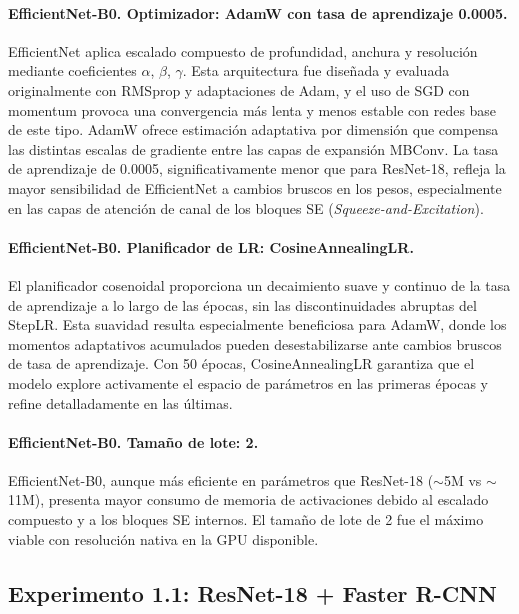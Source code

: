 \paragraph{EfficientNet-B0. Optimizador: AdamW con tasa de aprendizaje 0.0005.}
EfficientNet aplica escalado compuesto de profundidad, anchura y resolución mediante coeficientes $\alpha$, $\beta$, $\gamma$. Esta arquitectura fue diseñada y evaluada originalmente con RMSprop y adaptaciones de Adam, y el uso de SGD con momentum provoca una convergencia más lenta y menos estable con redes base de este tipo. AdamW ofrece estimación adaptativa por dimensión que compensa las distintas escalas de gradiente entre las capas de expansión MBConv. La tasa de aprendizaje de 0.0005, significativamente menor que para ResNet-18, refleja la mayor sensibilidad de EfficientNet a cambios bruscos en los pesos, especialmente en las capas de atención de canal de los bloques SE (\textit{Squeeze-and-Excitation}).

\paragraph{EfficientNet-B0. Planificador de LR: CosineAnnealingLR.}
El planificador cosenoidal proporciona un decaimiento suave y continuo de la tasa de aprendizaje a lo largo de las épocas, sin las discontinuidades abruptas del StepLR. Esta suavidad resulta especialmente beneficiosa para AdamW, donde los momentos adaptativos acumulados pueden desestabilizarse ante cambios bruscos de tasa de aprendizaje. Con 50 épocas, CosineAnnealingLR garantiza que el modelo explore activamente el espacio de parámetros en las primeras épocas y refine detalladamente en las últimas.

\paragraph{EfficientNet-B0. Tamaño de lote: 2.}
EfficientNet-B0, aunque más eficiente en parámetros que ResNet-18 ($\sim$5M vs $\sim$11M), presenta mayor consumo de memoria de activaciones debido al escalado compuesto y a los bloques SE internos. El tamaño de lote de 2 fue el máximo viable con resolución nativa en la GPU disponible.

\subsection{Experimento 1.1: ResNet-18 + Faster R-CNN}

